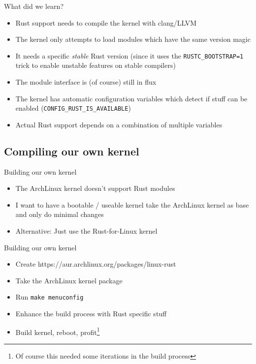 \begin{frame}[c,fragile]{What did we learn?}
  \small
\begin{itemize}
\item Rust support needs to compile the kernel with clang/LLVM
\item The kernel only attempts to load modules which have the same version magic
\item It needs a specific \emph{stable} Rust version {\footnotesize(since it uses the
\texttt{RUSTC\_BOOTSTRAP=1} trick to enable unstable features on stable compilers)}
\item The module interface is (of course) still in flux
\item The kernel has automatic configuration variables which detect if stuff can be enabled (\texttt{CONFIG\_RUST\_IS\_AVAILABLE})
\item Actual Rust support depends on a combination of multiple variables
\end{itemize}
\end{frame}

\subsection{Compiling our own kernel}

\begin{frame}[c,fragile]{Building our own kernel}
  \begin{itemize}
    \item The ArchLinux kernel doesn't support Rust modules
    \item I want to have a bootable / useable kernel \rightarrow{} take the
      ArchLinux kernel as base and only do minimal changes
    \item Alternative: Just use the Rust-for-Linux kernel
  \end{itemize}
\end{frame}

\begin{frame}[c,fragile]{Building our own kernel}
  \begin{itemize}
    \item Create https://aur.archlinux.org/packages/linux-rust
    \item Take the ArchLinux kernel package
    \item Run \texttt{make menuconfig}
    \item Enhance the build process with Rust specific stuff
    \item Build kernel, reboot, profit\footnote{Of course this needed some iterations in the build process}
  \end{itemize}
\end{frame}

